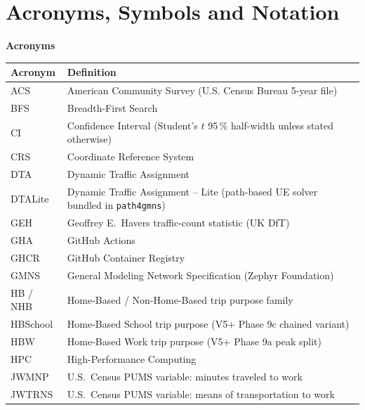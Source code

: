 
\clearpage
\thispagestyle{plain}
\section*{Acronyms, Symbols and Notation}
{}

\noindent\textbf{Acronyms}
\medskip

\setlength{\tabcolsep}{10pt}
\renewcommand{\arraystretch}{1.1}
\begin{xltabular}{\textwidth}{@{} l X @{}}
\toprule
\textbf{Acronym} & \textbf{Definition} \\
\midrule
ACS      & American Community Survey (U.S. Census Bureau 5-year file) \\
BFS      & Breadth-First Search \\
CI       & Confidence Interval (Student's $t$ 95\,\% half-width unless stated otherwise) \\
CRS      & Coordinate Reference System \\
DTA      & Dynamic Traffic Assignment \\
DTALite  & Dynamic Traffic Assignment {\tiny --} Lite (path-based UE solver bundled in \texttt{path4gmns}) \\
GEH      & Geoffrey E.\ Havers traffic-count statistic (UK DfT) \\
GHA      & GitHub Actions \\
GHCR     & GitHub Container Registry \\
GMNS     & General Modeling Network Specification (Zephyr Foundation) \\
HB / NHB & Home-Based / Non-Home-Based trip purpose family \\
HBSchool & Home-Based School trip purpose (V5+ Phase 9c chained variant) \\
HBW      & Home-Based Work trip purpose (V5+ Phase 9a peak split) \\
HPC      & High-Performance Computing \\
JWMNP    & U.S.\ Census PUMS variable: minutes traveled to work \\
JWTRNS   & U.S.\ Census PUMS variable: means of transportation to work \\

\end{xltabular}

